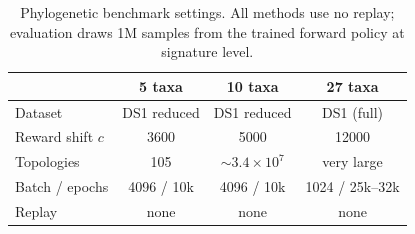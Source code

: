 \begin{table}[htbp]
\centering
\caption{Phylogenetic benchmark settings. All methods use no replay; evaluation
draws 1M samples from the trained forward policy at signature level.}
\label{tab:phylo-setup}
\begin{tabular}{lccc}
\toprule
 & 5 taxa & 10 taxa & 27 taxa \\
\midrule
Dataset        & DS1 reduced & DS1 reduced & DS1 (full) \\
Reward shift $c$ & 3600 & 5000 & 12000 \\
Topologies     & 105 & $\sim3.4\times10^{7}$ & very large \\
Batch / epochs & 4096 / 10k & 4096 / 10k & 1024 / 25k--32k \\
Replay         & none & none & none \\
\bottomrule
\end{tabular}
\end{table}
